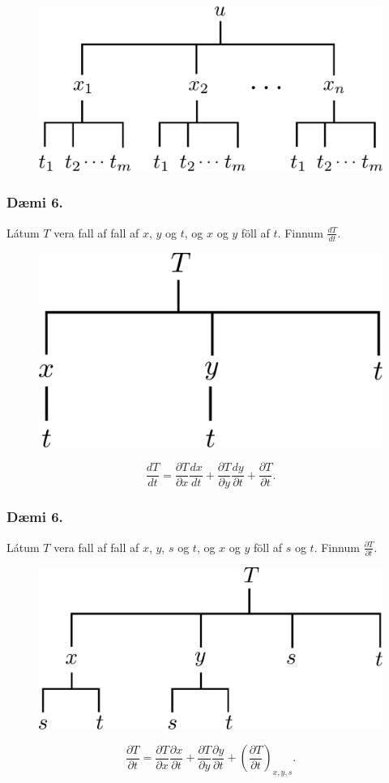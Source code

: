 \begin{figure}[h!]
           \centering
            \includegraphics[width=0.45\linewidth]{chain3}
    \end{figure}


\subsubsection{Dæmi 6.}
Látum $T$ vera fall af fall af $x$, $y$ og $t$, og $x$ og $y$ föll af $t$. Finnum $\frac{ dT}{dt}$.

\begin{figure}[h!]
           \centering
            \includegraphics[width=0.35\linewidth]{chain5}
    \end{figure}
$$\frac{d T}{d t} = \frac{\partial T}{\partial x} \frac{d x}{d t} +\frac{\partial T}{\partial y} \frac{d y}{\partial t} + \frac{\partial T}{\partial t} .$$


\subsubsection{Dæmi 6.}
Látum $T$ vera fall af fall af $x$, $y$, $s$ og $t$, og $x$ og $y$ föll af $s$ og $t$. Finnum $\frac{ \partial T}{\partial t}$.

\begin{figure}[h!]
           \centering
            \includegraphics[width=0.45\linewidth]{chain6}
    \end{figure}
$$\frac{\partial T}{\partial t} = \frac{\partial T}{\partial x} \frac{\partial x}{\partial t} +\frac{\partial T}{\partial y} \frac{\partial y}{\partial t} + \left(\frac{\partial T}{\partial t}\right)_{x,y,s} .$$


